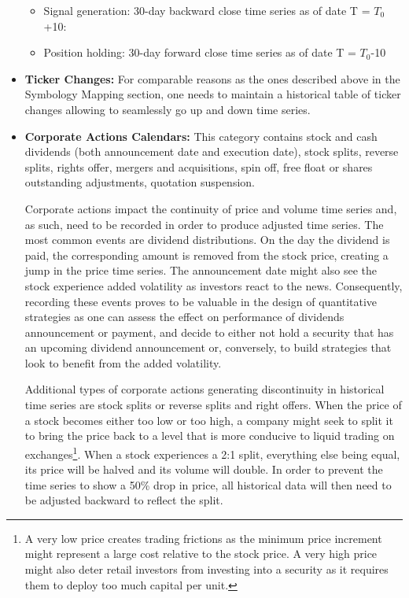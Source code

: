 \begin{itemize}
\begin{itemize}
\item Signal generation: 30-day backward close time series as of date T = $T_0$+10:

\hspace*{-0.5cm}{\tt select close from data where date in [$T_0$-20,  $T_0$+10], sym=EDF}

\item Position holding: 30-day forward close time series as of date T = $T_0$-10

\hspace*{-0.5cm}{\tt select close from data where date in [$T_0$-10,  $T_0$+20], sym=ABC}

\end{itemize}

\item \textbf{Ticker Changes:} For comparable reasons as the ones described above in the Symbology Mapping section, one needs to maintain a historical table of ticker changes allowing to seamlessly go up and down time series. 


\item \textbf{Corporate Actions Calendars:} This category contains stock and cash dividends (both announcement date and execution date), stock splits, reverse splits, rights offer, mergers and acquisitions, spin off, free float or shares outstanding adjustments, quotation suspension.


Corporate actions impact the continuity of price and volume time series and, as such, need to be recorded in order to produce adjusted time series. The most common events are dividend distributions. On the day the dividend is paid, the corresponding amount is removed from the stock price, creating a jump in the price time series. The announcement date might also see the stock experience added volatility as investors react to the news. Consequently, recording these events proves to be valuable in the design of quantitative strategies as one can assess the effect on performance of dividends announcement or payment, and decide to either not hold a security that has an upcoming dividend announcement or, conversely, to build strategies that look to benefit from the added volatility. 


Additional types of corporate actions generating discontinuity in historical time series are stock splits or reverse splits and right offers. When the price of a stock becomes either too low or too high, a company might seek to split it to bring the price back to a level that is more conducive to liquid trading on exchanges\footnote{A very low price creates trading frictions as the minimum price increment might represent a large cost relative to the stock price. A very high price might also deter retail investors from investing into a security as it requires them to deploy too much capital per unit.}. When a stock experiences a 2:1 split, everything else being equal, its price will be halved and its volume will double. In order to prevent the time series to show a 50\% drop in price, all historical data will then need to be adjusted backward to reflect the split.



\end{itemize}
